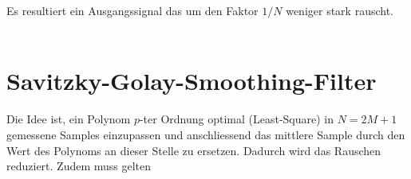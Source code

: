 	 Es resultiert ein Ausgangssignal das um den Faktor $1/N$ weniger stark rauscht.\\[0.2cm]
	 $\qquad$
	 \\

\newpage
\section{Savitzky-Golay-Smoothing-Filter}
	\begin{goal}
	 Die Idee ist, ein Polynom $p$-ter Ordnung optimal (Least-Square) in $N = 2M+1$ gemessene Samples einzupassen und anschliessend das mittlere Sample durch den Wert des Polynoms an dieser Stelle zu ersetzen. Dadurch wird das Rauschen reduziert. Zudem muss gelten $\quad$
	\end{goal}

